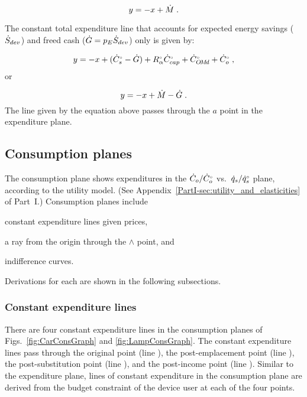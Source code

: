 \begin{equation}
  y = -x + \dot{M} \; .
\end{equation}

The constant total expenditure line 
that accounts for expected energy savings ($\dot{S}_{dev}$) 
and freed cash ($\dot{G} = p_E \dot{S}_{dev}$) only 
is given by:

\begin{equation}
  y = -x + ({}{\dot{C}}^{\scriptscriptstyle \circ}_s - \dot{G}) + {}{R}^{\scriptscriptstyle \circ}_\alpha {}{\dot{C}}^{\scriptscriptstyle \circ}_{cap} + {}{\dot{C}}^{\scriptscriptstyle \circ}_{O\!M\!d} + {}{\dot{C}}^{\scriptscriptstyle \circ}_o \; ,
\end{equation}
%
or

\begin{equation}
  y = -x + \dot{M} - \dot{G}\; .
\end{equation}
%
The line given by the equation above
passes through the $a$ point in the expenditure plane.


\subsection{Consumption planes}
\label{sec:cons_path_graph_details}

The consumption plane shows expenditures in 
the $\dot{C}_o/{}{\dot{C}}^{\scriptscriptstyle \circ}_o$ vs.\ $\dot{q}_s/{}{\dot{q}}^{\scriptscriptstyle \circ}_s$ plane,
according to the utility model.
(See Appendix~\ref{PartI-sec:utility_and_elasticities} of Part~I.)
Consumption planes include 
%
\begin{enumerate*}[label={(\roman*)}]
	
  \item constant expenditure lines given prices,
  
  \item a ray from the origin through the $\wedge$ point, and 
  
  \item indifference curves.
    
\end{enumerate*}
%
Derivations for each are shown in the following subsections.


\subsubsection{Constant expenditure lines} 
\label{sec:pref_graph_constant_expenditure_lines}

There are four constant expenditure lines in the consumption planes of
Figs.~\ref{fig:CarConsGraph} and \ref{fig:LampConsGraph}.
The constant expenditure lines pass through 
the original point (line \circcirc{}), 
the post-emplacement point (line \starstar{}), 
the post-substitution point (line \hathat{}), and 
the post-income point (line \barbar{}).
Similar to the expenditure plane, 
lines of constant expenditure in the consumption plane
are derived from the budget constraint of the device user
at each of the four points.

